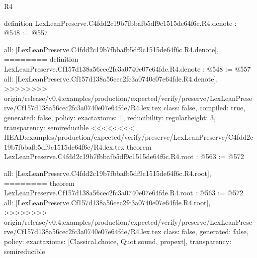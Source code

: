 \begin{lexlean}{R4}
\begin{coremodule}
{{{{{{definition LexLeanPreserve.C4fdd2c19b7fbbafb5df9c1515de64f6c.R4.denote : @548 := @557 {
  all: [LexLeanPreserve.C4fdd2c19b7fbbafb5df9c1515de64f6c.R4.denote],
========
definition LexLeanPreserve.Cf157d138a56cec2fc3a0740e07e64fde.R4.denote : @548 := @557 {
  all: [LexLeanPreserve.Cf157d138a56cec2fc3a0740e07e64fde.R4.denote],
>>>>>>>> origin/release/v0.4:examples/production/expected/verify/preserve/LexLeanPreserve/Cf157d138a56cec2fc3a0740e07e64fde/R4.lex.tex
  class: false,
  compiled: true,
  generated: false,
  policy: exact{axioms: []},
  reducibility: regular{height: 3},
  transparency: semireducible
}
<<<<<<<< HEAD:examples/production/expected/verify/preserve/LexLeanPreserve/C4fdd2c19b7fbbafb5df9c1515de64f6c/R4.lex.tex
theorem LexLeanPreserve.C4fdd2c19b7fbbafb5df9c1515de64f6c.R4.root : @563 := @572 {
  all: [LexLeanPreserve.C4fdd2c19b7fbbafb5df9c1515de64f6c.R4.root],
========
theorem LexLeanPreserve.Cf157d138a56cec2fc3a0740e07e64fde.R4.root : @563 := @572 {
  all: [LexLeanPreserve.Cf157d138a56cec2fc3a0740e07e64fde.R4.root],
>>>>>>>> origin/release/v0.4:examples/production/expected/verify/preserve/LexLeanPreserve/Cf157d138a56cec2fc3a0740e07e64fde/R4.lex.tex
  class: false,
  generated: false,
  policy: exact{axioms: [Classical.choice, Quot.sound, propext]},
  transparency: semireducible
}

}}}}}}}}
\end{coremodule}
\end{lexlean}
